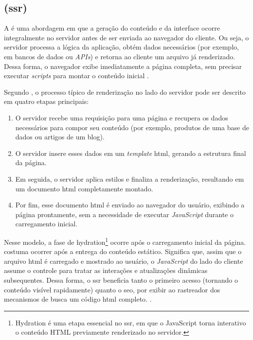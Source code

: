 \subsection{ (\acrshort{ssr})}
\label{subsec:ssr}

A \textbf{} é uma abordagem em que a geração do conteúdo e da interface ocorre integralmente no servidor antes de ser enviada ao navegador do cliente. Ou seja, o servidor processa a lógica da aplicação, obtém dados necessários (por exemplo, em bancos de dados ou \emph{APIs}) e retorna ao cliente um arquivo  já renderizado. Dessa forma, o navegador exibe imediatamente a página completa, sem precisar executar \emph{scripts} para montar o conteúdo inicial \cite{atori2024}. 

Segundo , o processo típico de renderização no lado do servidor pode ser descrito em quatro etapas principais:

\begin{enumerate}
    \item O servidor recebe uma requisição para uma página e recupera os dados necessários para compor seu conteúdo (por exemplo, produtos de uma base de dados ou artigos de um blog).
    \item O servidor insere esses dados em um \emph{template} \acrshort{html}, gerando a estrutura final da página.
    \item Em seguida, o servidor aplica estilos e finaliza a renderização, resultando em um documento \acrshort{html} completamente montado.
    \item Por fim, esse documento \acrshort{html} é enviado ao navegador do usuário, exibindo a página prontamente, sem a necessidade de executar \emph{JavaScript} durante o carregamento inicial.
\end{enumerate}

Nesse modelo, a fase de hydration\footnote{Hydration é uma etapa essencial no \acrshort{ssr}, em que o JavaScript torna interativo o conteúdo HTML previamente renderizado no servidor.} ocorre após o carregamento inicial da página. costuma ocorrer após a entrega do conteúdo estático. Significa que, assim que o arquivo \acrshort{html} é carregado e mostrado ao usuário, o \emph{JavaScript} do lado do cliente assume o controle para tratar as interações e atualizações dinâmicas subsequentes. Dessa forma, o \acrshort{ssr} beneficia tanto o primeiro acesso (tornando o conteúdo visível rapidamente) quanto o \acrshort{seo}, por exibir ao rastreador dos mecanismos de busca um código \acrshort{html} completo. \cite{atori2024}.

